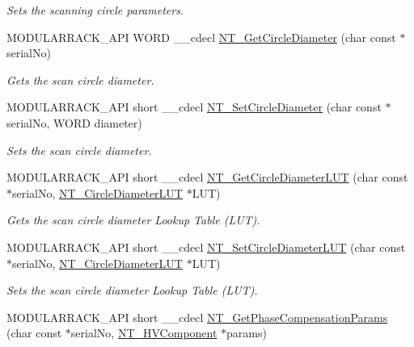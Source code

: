 \begin{DoxyCompactItemize}
\begin{DoxyCompactList}\small\item\em Sets the scanning circle parameters. \end{DoxyCompactList}\item 
M\+O\+D\+U\+L\+A\+R\+R\+A\+C\+K\+\_\+\+A\+PI W\+O\+RD \+\_\+\+\_\+cdecl \hyperlink{group___modular_nano_trak_gac2b3b3130aa0849c6ce7aedb118dd119}{N\+T\+\_\+\+Get\+Circle\+Diameter} (char const $\ast$serial\+No)
\begin{DoxyCompactList}\small\item\em Gets the scan circle diameter. \end{DoxyCompactList}\item 
M\+O\+D\+U\+L\+A\+R\+R\+A\+C\+K\+\_\+\+A\+PI short \+\_\+\+\_\+cdecl \hyperlink{group___modular_nano_trak_ga024f68d8bf2a8a11a5e3e0978a1f9332}{N\+T\+\_\+\+Set\+Circle\+Diameter} (char const $\ast$serial\+No, W\+O\+RD diameter)
\begin{DoxyCompactList}\small\item\em Sets the scan circle diameter. \end{DoxyCompactList}\item 
M\+O\+D\+U\+L\+A\+R\+R\+A\+C\+K\+\_\+\+A\+PI short \+\_\+\+\_\+cdecl \hyperlink{group___modular_nano_trak_gad4df1f7b4e58e017424258c6f1d92314}{N\+T\+\_\+\+Get\+Circle\+Diameter\+L\+UT} (char const $\ast$serial\+No, \hyperlink{struct_n_t___circle_diameter_l_u_t}{N\+T\+\_\+\+Circle\+Diameter\+L\+UT} $\ast$L\+UT)
\begin{DoxyCompactList}\small\item\em Gets the scan circle diameter Lookup Table (L\+UT). \end{DoxyCompactList}\item 
M\+O\+D\+U\+L\+A\+R\+R\+A\+C\+K\+\_\+\+A\+PI short \+\_\+\+\_\+cdecl \hyperlink{group___modular_nano_trak_ga5df399f40b4ca1b88b406677568fdd8a}{N\+T\+\_\+\+Set\+Circle\+Diameter\+L\+UT} (char const $\ast$serial\+No, \hyperlink{struct_n_t___circle_diameter_l_u_t}{N\+T\+\_\+\+Circle\+Diameter\+L\+UT} $\ast$L\+UT)
\begin{DoxyCompactList}\small\item\em Sets the scan circle diameter Lookup Table (L\+UT). \end{DoxyCompactList}\item 
M\+O\+D\+U\+L\+A\+R\+R\+A\+C\+K\+\_\+\+A\+PI short \+\_\+\+\_\+cdecl \hyperlink{group___modular_nano_trak_ga0a5c6132039283e0b1f47b1622f02a4b}{N\+T\+\_\+\+Get\+Phase\+Compensation\+Params} (char const $\ast$serial\+No, \hyperlink{struct_n_t___h_v_component}{N\+T\+\_\+\+H\+V\+Component} $\ast$params)

\end{DoxyCompactItemize}
